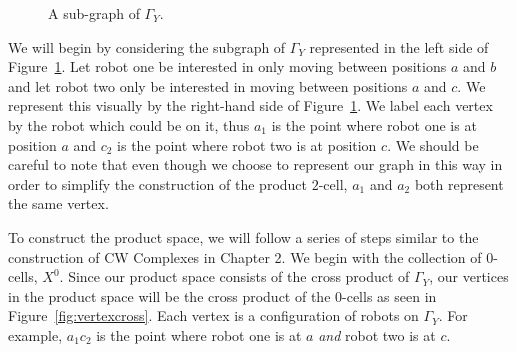 \documentclass{amsart}
\newcommand{\Y}{\Gamma_Y}
\begin{document}
\begin{figure}[h]
\caption{A sub-graph of $\Y$.}\label{fig:subgraph}
\centering
{}
\hspace{1in}
\end{figure}

We will begin by considering the subgraph of $\Gamma_{Y}$ represented in the left side of Figure~\ref{fig:subgraph}. Let robot one be interested in only moving between positions $a$ and $b$ and let robot two only be interested in moving between positions $a$ and $c$. We represent this visually by the right-hand side of Figure~\ref{fig:subgraph}. We label each vertex by the robot which could be on it, thus $a_1$ is the point where robot one is at position $a$ and $c_2$ is the point where robot two is at position $c$. We should be careful to note that even though we choose to represent our graph in this way in order to simplify the construction of the product $2$-cell, $a_1$ and $a_2$ both represent the same vertex.

To construct the product space, we will follow a series of steps similar to the construction of CW Complexes in Chapter 2. We begin with the collection of $0$-cells, $X^0$. Since our product space consists of the cross product of $\Y$, our vertices in the product space will be the cross product of the $0$-cells as seen in Figure~\ref{fig:vertexcross}. Each vertex is a configuration of robots on $\Y$. For example, $a_1c_2$ is the point where robot one is at $a$ \textit{and} robot two is at $c$.
\end{document}
